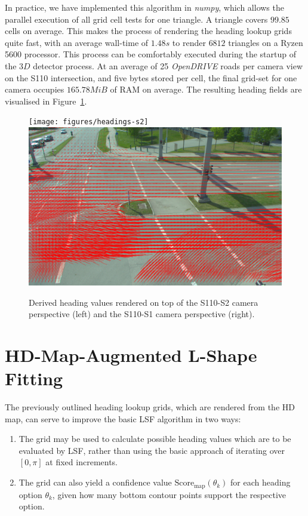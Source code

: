 In practice, we have implemented this algorithm in \textit{numpy}, which allows the parallel execution of all grid cell tests for one triangle.
A triangle covers $99.85$ cells on average.
This makes the process of rendering the heading lookup grids quite fast, with an average wall-time of $1.48s$ to render $6812$ triangles on a Ryzen 5600 processor.
This process can be comfortably executed during the startup of the $3D$ detector process.
At an average of 25 \textit{OpenDRIVE} roads per camera view on the S110 intersection, and five bytes stored per cell, the final grid-set for one camera occupies $165.78 MiB$ of RAM on average.
The resulting heading fields are visualised in Figure~\ref{fig:headings-rendered}.

\begin{figure}[htb]
    \centering
    \texttt{[image: figures/headings-s2]}
    \includegraphics[width=0.49\linewidth]{figures/headings-s1}
    \caption{Derived heading values rendered on top of the S110-S2 camera perspective (left) and the S110-S1 camera perspective (right).}
    \label{fig:headings-rendered}
\end{figure}


\section{HD-Map-Augmented L-Shape Fitting}
\label{sec:hdmaplsf}

The previously outlined heading lookup grids, which are rendered from the HD map, can serve to improve the basic LSF algorithm in two ways:

\begin{enumerate}
    \item The grid may be used to calculate possible heading values which are to be evaluated by LSF, rather than using the basic approach of iterating over $[0, \pi]$ at fixed increments.
    \item The grid can also yield a confidence value $\text{Score}_\text{map}(\theta_k)$ for each heading option $\theta_k$, given how many bottom contour points support the respective option.
\end{enumerate}

